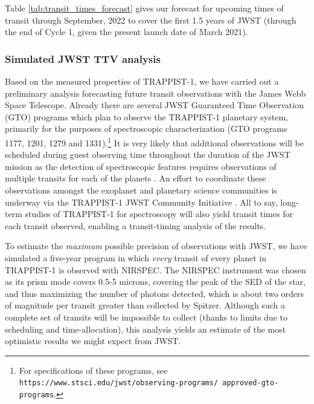 \documentclass[fleqn,usenatbib]{mnras} %
\begin{document}
Table \ref{tab:transit_times_forecast} gives our forecast for upcoming times of transit through September, 2022 to cover the first 1.5 years of JWST (through the end of Cycle 1, given the present launch date of March 2021).


\subsubsection{Simulated JWST TTV analysis}

Based on the measured properties of TRAPPIST-1, we have carried out a preliminary analysis forecasting future transit observations with the James Webb Space Telescope. Already there are several JWST Guaranteed Time Observation (GTO) programs which plan to observe the TRAPPIST-1 planetary system, primarily for the purposes of spectroscopic characterization (GTO programs 1177, 1201, 1279 and 1331).\footnote{For specifications of these programs, see \texttt{https://www.stsci.edu/jwst/observing-programs/ approved-gto-programs}.}  It is very likely that additional observations will be scheduled during guest observing  time throughout the duration of the JWST mission as the detection of spectroscopic features requires observations of multiple transits for each of the planets \citep{Morley2017,Barstow2016,Lustig-Yaeger2019,Fauchez2020b}.   An effort to coordinate these observations amongst the exoplanet and planetary science communities is underway via the TRAPPIST-1 JWST Community Initiative \citep{Gillon2020}.  All to say, long-term studies of TRAPPIST-1 for spectroscopy will also yield transit times for each transit observed, enabling a transit-timing analysis of the results.

To estimate the {\it maximum} possible precision of observations with JWST, we have simulated a five-year program in which {\it every} transit of every planet in TRAPPIST-1 is observed with NIRSPEC.   The NIRSPEC instrument was chosen as its prism mode covers 0.5-5 microns, covering the peak of the SED of the star, and thus maximizing the number of photons detected, which is about two orders of magnitude per transit greater than collected by Spitzer. Although such a complete set of transits will be impossible to collect (thanks to limits due to scheduling and time-allocation), this analysis yields an estimate of the most optimistic results we might expect from JWST.
\end{document}
